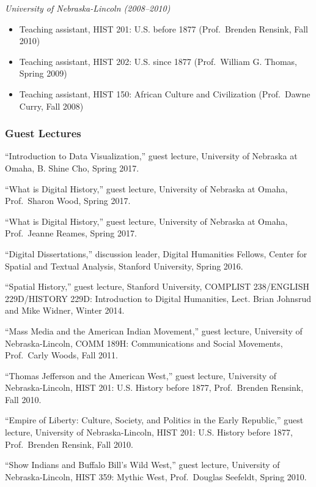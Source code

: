 \emph{University of Nebraska-Lincoln (2008--2010)}

\begin{itemize}
\tightlist
\item
  Teaching assistant, HIST 201: U.S. before 1877 (Prof.~Brenden Rensink,
  Fall 2010)
\item
  Teaching assistant, HIST 202: U.S. since 1877 (Prof.~William G.
  Thomas, Spring 2009)
\item
  Teaching assistant, HIST 150: African Culture and Civilization
  (Prof.~Dawne Curry, Fall 2008)
\end{itemize}

\subsubsection{Guest Lectures}\label{guest-lectures}

``Introduction to Data Visualization,'' guest lecture, University of
Nebraska at Omaha, B. Shine Cho, Spring 2017.

``What is Digital History,'' guest lecture, University of Nebraska at
Omaha, Prof.~Sharon Wood, Spring 2017.

``What is Digital History,'' guest lecture, University of Nebraska at
Omaha, Prof.~Jeanne Reames, Spring 2017.

``Digital Dissertations,'' discussion leader, Digital Humanities
Fellows, Center for Spatial and Textual Analysis, Stanford University,
Spring 2016.

``Spatial History,'' guest lecture, Stanford University, COMPLIST
238/ENGLISH 229D/HISTORY 229D: Introduction to Digital Humanities, Lect.
Brian Johnsrud and Mike Widner, Winter 2014.

``Mass Media and the American Indian Movement,'' guest lecture,
University of Nebraska-Lincoln, COMM 189H: Communications and Social
Movements, Prof.~Carly Woods, Fall 2011.

``Thomas Jefferson and the American West,'' guest lecture, University of
Nebraska-Lincoln, HIST 201: U.S. History before 1877, Prof.~Brenden
Rensink, Fall 2010.

``Empire of Liberty: Culture, Society, and Politics in the Early
Republic,'' guest lecture, University of Nebraska-Lincoln, HIST 201:
U.S. History before 1877, Prof.~Brenden Rensink, Fall 2010.

``Show Indians and Buffalo Bill's Wild West,'' guest lecture, University
of Nebraska-Lincoln, HIST 359: Mythic West, Prof.~Douglas Seefeldt,
Spring 2010.

